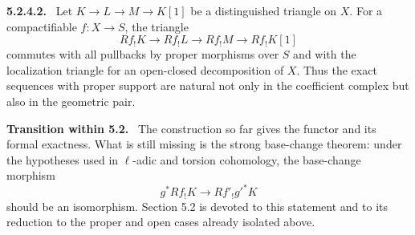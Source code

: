 \documentclass[12pt]{article}
\newenvironment{statement}[1]{\par\medskip\noindent\textbf{#1.}\ }{\par\medskip}
\newenvironment{remarktext}[1]{\par\medskip\noindent\textbf{#1.}\ }{\par\medskip}
\begin{document}
\begin{statement}{5.2.4.2}
Let \(K\to L\to M\to K[1]\) be a distinguished triangle on \(X\). For a compactifiable \(f:X\to S\), the triangle
\[
Rf_!K\to Rf_!L\to Rf_!M\to Rf_!K[1]
\]
commutes with all pullbacks by proper morphisms over \(S\) and with the localization triangle for an open-closed decomposition of \(X\). Thus the exact sequences with proper support are natural not only in the coefficient complex but also in the geometric pair.
\end{statement}

\begin{remarktext}{Transition within 5.2}
The construction so far gives the functor and its formal exactness. What is still missing is the strong base-change theorem: under the hypotheses used in \(\ell\)-adic and torsion cohomology, the base-change morphism
\[
g^*Rf_!K\to Rf'_!g'^*K
\]
should be an isomorphism. Section 5.2 is devoted to this statement and to its reduction to the proper and open cases already isolated above.
\end{remarktext}

\bigskip
\end{document}
